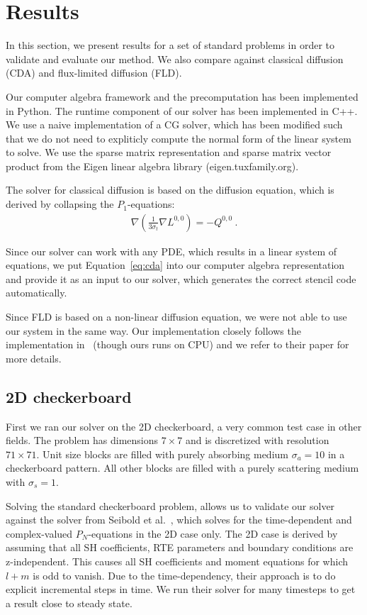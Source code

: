 \section{Results}
\label{sec:results}

In this section, we present results for a set of standard problems in order to validate and evaluate our method. We also compare against classical diffusion (CDA) and flux-limited diffusion (FLD).

Our computer algebra framework and the precomputation has been implemented in Python. The runtime component of our solver has been implemented in C++. We use a naive implementation of a CG solver, which has been modified such that we do not need to expliticly compute the normal form of the linear system to solve. We use the sparse matrix representation and sparse matrix vector product from the Eigen linear algebra library (eigen.tuxfamily.org).

The solver for classical diffusion is based on the diffusion equation, which is derived by collapsing the $P_1$-equations:
\begin{align} 
\nabla\left(\frac{1}{3\sigma_t}\nabla L^{0,0}\right)  = -Q^{0,0}
\ .
\label{eq:cda}
\end{align}

Since our solver can work with any PDE, which results in a linear system of equations, we put Equation~\ref{eq:cda} into our computer algebra representation and provide it as an input to our solver, which generates the correct stencil code automatically.

Since FLD is based on a non-linear diffusion equation, we were not able to use our system in the same way. Our implementation closely follows the implementation in~\cite{Koerner14} (though ours runs on CPU) and we refer to their paper for more details.

\subsection{2D checkerboard}

First we ran our solver on the 2D checkerboard, a very common test case in other fields. The problem has dimensions $7\times 7$ and is discretized with resolution $71\times 71$. Unit size blocks are filled with purely absorbing medium $\sigma_a=10$ in a checkerboard pattern. All other blocks are filled with a purely scattering medium with $\sigma_s=1$.

Solving the standard checkerboard problem, allows us to validate our solver against the solver from Seibold et al.~\cite{Seibold14}, which solves for the time-dependent and complex-valued $P_N$-equations in the 2D case only. The 2D case is derived by assuming that all SH coefficients, RTE parameters and boundary conditions are z-independent. This causes all SH coefficients and moment equations for which $l+m$ is odd to vanish. Due to the time-dependency, their approach is to do explicit incremental steps in time. We run their solver for many timesteps to get a result close to steady state.

